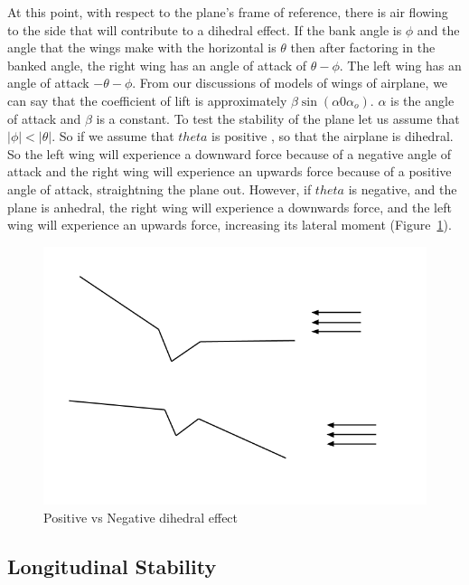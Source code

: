 At this point, with respect to the plane's frame of reference, there is air flowing 
to the side that will contribute to a dihedral effect. 
If the bank angle is $\phi$ and
the angle that the wings make with the horizontal is $\theta$ then after factoring in
the banked angle, the right wing has an angle of attack of  $\theta - \phi$.
The left wing has an angle of attack $- \theta - \phi$.
From our discussions of models of wings of airplane, we can say that the
coefficient of lift is approximately $\beta \sin(\alpha 0 \alpha_o)$.
$\alpha$ is the angle of attack and $\beta$ is a constant. To test the stability of the plane
let us assume that $|\phi| < |\theta|$.
So if we assume that $theta$ is positive , so that the airplane is dihedral.
So the left wing will experience a downward force because of a negative angle of attack
and the right wing will experience an upwards force because of a positive angle of attack, straightning the plane out.
However, if $theta$ is negative, and the plane is anhedral, the right wing will experience a
downwards force, and the left wing will experience an upwards force, increasing its lateral moment
(Figure~\ref{fig:dihedral2}). 


\begin{figure}[hl]
  \centering
    \includegraphics[scale=.5]{figures/dihedral2.png}
    \caption{Positive vs Negative dihedral effect}
  \label{fig:dihedral2}
\end{figure}


\subsection{Longitudinal Stability}
\label{sec:long_stability}

